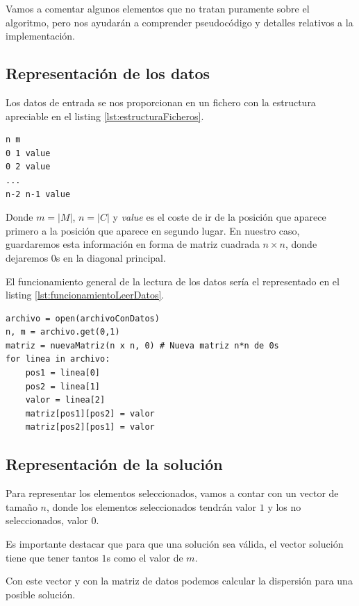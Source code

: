 Vamos a comentar algunos elementos que no tratan puramente sobre el algoritmo, pero nos ayudarán a comprender pseudocódigo y detalles relativos a la implementación.

\subsection{Representación de los datos}

Los datos de entrada se nos proporcionan en un fichero con la estructura apreciable en el listing \ref{lst:estructuraFicheros}.

\begin{lstlisting}[frame=single,caption={Estructura de los ficheros proporcionados},label=lst:estructuraFicheros, captionpos=b]
n m
0 1 value
0 2 value
...
n-2 n-1 value
\end{lstlisting}

Donde $m = |M|$, $n = |C|$ y \textit{value} es el coste de ir de la posición que aparece primero a la posición que aparece en segundo lugar. En nuestro caso, guardaremos esta información en forma de matriz cuadrada $n \times n$, donde dejaremos 0s en la diagonal principal.

El funcionamiento general de la lectura de los datos sería el representado en el listing \ref{lst:funcionamientoLeerDatos}.

\begin{lstlisting}[frame=single, caption={Generalización de la lectura de los datos},label=lst:funcionamientoLeerDatos, captionpos=b]
archivo = open(archivoConDatos)
n, m = archivo.get(0,1)
matriz = nuevaMatriz(n x n, 0) # Nueva matriz n*n de 0s
for linea in archivo:
    pos1 = linea[0]
    pos2 = linea[1]
    valor = linea[2]
    matriz[pos1][pos2] = valor
    matriz[pos2][pos1] = valor
\end{lstlisting}


\subsection{Representación de la solución}

Para representar los elementos seleccionados, vamos a contar con un vector de tamaño $n$, donde los elementos seleccionados tendrán valor $1$ y los no seleccionados, valor $0$.

Es importante destacar que para que una solución sea válida, el vector solución tiene que tener tantos $1$s como el valor de $m$.

Con este vector y con la matriz de datos podemos calcular la dispersión para una posible solución.


